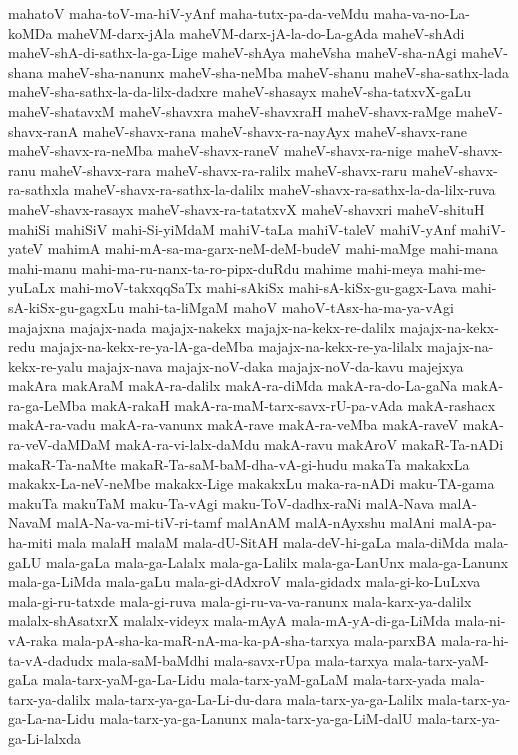 {mahatoV
maha-toV-ma-hiV-yAnf
maha-tutx-pa-da-veMdu
maha-va-no-La-koMDa
maheVM-darx-jAla
maheVM-darx-jA-la-do-La-gAda
maheV-shAdi
maheV-shA-di-sathx-la-ga-Lige
maheV-shAya
maheVsha
maheV-sha-nAgi
maheV-shana
maheV-sha-nanunx
maheV-sha-neMba
maheV-shanu
maheV-sha-sathx-lada
maheV-sha-sathx-la-da-lilx-dadxre
maheV-shasayx
maheV-sha-tatxvX-gaLu
maheV-shatavxM
maheV-shavxra
maheV-shavxraH
maheV-shavx-raMge
maheV-shavx-ranA
maheV-shavx-rana
maheV-shavx-ra-nayAyx
maheV-shavx-rane
maheV-shavx-ra-neMba
maheV-shavx-raneV
maheV-shavx-ra-nige
maheV-shavx-ranu
maheV-shavx-rara
maheV-shavx-ra-ralilx
maheV-shavx-raru
maheV-shavx-ra-sathxla
maheV-shavx-ra-sathx-la-dalilx
maheV-shavx-ra-sathx-la-da-lilx-ruva
maheV-shavx-rasayx
maheV-shavx-ra-tatatxvX
maheV-shavxri
maheV-shituH
mahiSi
mahiSiV
mahi-Si-yiMdaM
mahiV-taLa
mahiV-taleV
mahiV-yAnf
mahiV-yateV
mahimA
mahi-mA-sa-ma-garx-neM-deM-budeV
mahi-maMge
mahi-mana
mahi-manu
mahi-ma-ru-nanx-ta-ro-pipx-duRdu
mahime
mahi-meya
mahi-me-yuLaLx
mahi-moV-takxqqSaTx
mahi-sAkiSx
mahi-sA-kiSx-gu-gagx-Lava
mahi-sA-kiSx-gu-gagxLu
mahi-ta-liMgaM
mahoV
mahoV-tAsx-ha-ma-ya-vAgi
majajxna
majajx-nada
majajx-nakekx
majajx-na-kekx-re-dalilx
majajx-na-kekx-redu
majajx-na-kekx-re-ya-lA-ga-deMba
majajx-na-kekx-re-ya-lilalx
majajx-na-kekx-re-yalu
majajx-nava
majajx-noV-daka
majajx-noV-da-kavu
majejxya
makAra
makAraM
makA-ra-dalilx
makA-ra-diMda
makA-ra-do-La-gaNa
makA-ra-ga-LeMba
makA-rakaH
makA-ra-maM-tarx-savx-rU-pa-vAda
makA-rashacx
makA-ra-vadu
makA-ra-vanunx
makA-rave
makA-ra-veMba
makA-raveV
makA-ra-veV-daMDaM
makA-ra-vi-lalx-daMdu
makA-ravu
makAroV
makaR-Ta-nADi
makaR-Ta-naMte
makaR-Ta-saM-baM-dha-vA-gi-hudu
makaTa
makakxLa
makakx-La-neV-neMbe
makakx-Lige
makakxLu
maka-ra-nADi
maku-TA-gama
makuTa
makuTaM
maku-Ta-vAgi
maku-ToV-dadhx-raNi
malA-Nava
malA-NavaM
malA-Na-va-mi-tiV-ri-tamf
malAnAM
malA-nAyxshu
malAni
malA-pa-ha-miti
mala
malaH
malaM
mala-dU-SitAH
mala-deV-hi-gaLa
mala-diMda
mala-gaLU
mala-gaLa
mala-ga-Lalalx
mala-ga-Lalilx
mala-ga-LanUnx
mala-ga-Lanunx
mala-ga-LiMda
mala-gaLu
mala-gi-dAdxroV
mala-gidadx
mala-gi-ko-LuLxva
mala-gi-ru-tatxde
mala-gi-ruva
mala-gi-ru-va-va-ranunx
mala-karx-ya-dalilx
malalx-shAsatxrX
malalx-videyx
mala-mAyA
mala-mA-yA-di-ga-LiMda
mala-ni-vA-raka
mala-pA-sha-ka-maR-nA-ma-ka-pA-sha-tarxya
mala-parxBA
mala-ra-hi-ta-vA-dadudx
mala-saM-baMdhi
mala-savx-rUpa
mala-tarxya
mala-tarx-yaM-gaLa
mala-tarx-yaM-ga-La-Lidu
mala-tarx-yaM-gaLaM
mala-tarx-yada
mala-tarx-ya-dalilx
mala-tarx-ya-ga-La-Li-du-dara
mala-tarx-ya-ga-Lalilx
mala-tarx-ya-ga-La-na-Lidu
mala-tarx-ya-ga-Lanunx
mala-tarx-ya-ga-LiM-dalU
mala-tarx-ya-ga-Li-lalxda
}
